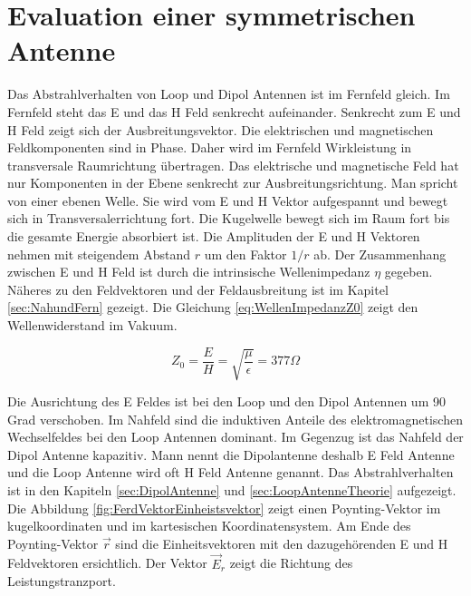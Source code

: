 \newpage
\section{Evaluation einer symmetrischen Antenne}
Das Abstrahlverhalten von Loop und Dipol Antennen ist im Fernfeld gleich. Im Fernfeld steht das E und das H Feld senkrecht aufeinander. Senkrecht zum E und H Feld zeigt sich der Ausbreitungsvektor. Die elektrischen und
magnetischen Feldkomponenten sind in Phase. Daher wird im Fernfeld Wirkleistung in transversale Raumrichtung
übertragen. Das elektrische und magnetische Feld hat nur Komponenten in der Ebene senkrecht zur Ausbreitungsrichtung.
Man spricht von einer ebenen Welle. Sie wird vom E und H Vektor aufgespannt  und bewegt sich in
Transversalerrichtung fort. Die Kugelwelle bewegt sich im Raum fort bis die gesamte Energie absorbiert ist. Die Amplituden der E und H Vektoren
nehmen mit steigendem Abstand $r$ um den Faktor $1/r$  ab. Der Zusammenhang zwischen E und H Feld ist
durch die intrinsische Wellenimpedanz $\eta$ gegeben. Näheres zu den Feldvektoren und der Feldausbreitung ist im Kapitel \ref{sec:NahundFern} gezeigt.
Die Gleichung \ref{eq:WellenImpedanzZ0} zeigt den Wellenwiderstand im Vakuum\cite{elliott1981antenna}.


\begin{equation}\label{eq:WellenImpedanzZ0}
Z_{0}=\dfrac{E}{H}=\sqrt{\dfrac{\mu}{\epsilon}}=377\Omega
\end{equation}

\cite{rothammel1991antennenbuch}
\cite{elliott1981antenna}
\cite{Harrington-TimeHarmonic}
\cite{Emant}

Die Ausrichtung des E Feldes ist bei den Loop und den Dipol Antennen um 90 Grad verschoben. 
Im Nahfeld sind die induktiven Anteile des elektromagnetischen Wechselfeldes bei den Loop Antennen dominant. 
Im Gegenzug ist das Nahfeld der Dipol Antenne  kapazitiv.
Mann nennt die Dipolantenne deshalb E Feld Antenne und die Loop Antenne wird oft H Feld Antenne genannt.
Das Abstrahlverhalten ist in den Kapiteln \ref{sec:DipolAntenne} und \ref{sec:LoopAntenneTheorie} aufgezeigt. Die Abbildung \ref{fig:FerdVektorEinheistsvektor} zeigt einen Poynting-Vektor im  kugelkoordinaten und im kartesischen Koordinatensystem. Am Ende des Poynting-Vektor $\vec{r}$  sind die Einheitsvektoren mit den dazugehörenden  E und H Feldvektoren ersichtlich\cite{Emant}. Der Vektor $\vec{E}_r$ zeigt die Richtung des Leistungstranzport.\\



